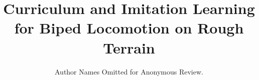 \documentclass[conference]{IEEEtran}
\begin{document}
\title{Curriculum and Imitation Learning for Biped Locomotion on Rough Terrain}

\author{Author Names Omitted for Anonymous Review.}





% 


\maketitle
\end{document}
